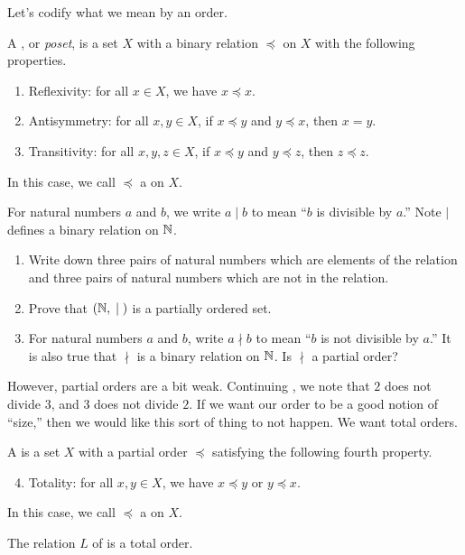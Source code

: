 \documentclass[../main.tex]{subfiles}
\begin{document}
Let's codify what we mean by an order.
\begin{definition}
    A , or \textit{poset}, is a set $X$ with a binary relation $\preceq$ on $X$ with the following properties.
    \begin{enumerate}[label=(\alph*)]
        \item Reflexivity: for all $x \in X$, we have $x \preceq x$.
        \item Antisymmetry: for all $x, y \in X$, if $x \preceq y$ and $y \preceq x$, then $x = y$.
        \item Transitivity: for all $x, y, z \in X$, if $x \preceq y$ and $y \preceq z$, then $z \preceq z$.
    \end{enumerate}
    In this case, we call $\preceq$ a  on $X$. %
\end{definition}
\begin{exercise} \label{exe:div-on-n}
    For natural numbers $a$ and $b$, we write $a \mid b$ to mean ``$b$ is divisible by $a$.'' Note $\mid$ defines a binary relation on $\mathbb N$.
    \begin{enumerate}[label=(\alph*)]
        \item Write down three pairs of natural numbers which are elements of the relation and three pairs of natural numbers which are not in the relation.
        \item Prove that $(\mathbb N, {}\mid{})$ is a partially ordered set.
        \item For natural numbers $a$ and $b$, write $a\nmid b$ to mean ``$b$ is not divisible by $a$.'' It is also true that $\nmid$ is a binary relation on $\mathbb N$. Is $\nmid$ a partial order?
    \end{enumerate}
\end{exercise}
However, partial orders are a bit weak. Continuing , we note that $2$ does not divide $3$, and $3$ does not divide $2$. If we want our order to be a good notion of ``size,'' then we would like this sort of thing to not happen. We want total orders.
\begin{definition}
    A  is a set $X$ with a partial order $\preceq$ satisfying the following fourth property.
    \begin{enumerate}[label=(\alph*)]
        \setcounter{enumi}{3}
        \item Totality: for all $x,y\in X$, we have $x\preceq y$ or $y\preceq x$.
    \end{enumerate}
    In this case, we call $\preceq$ a  on $X$.
\end{definition}
\begin{example}
    The relation $L$ of  is a total order.
\end{example}
\end{document}
